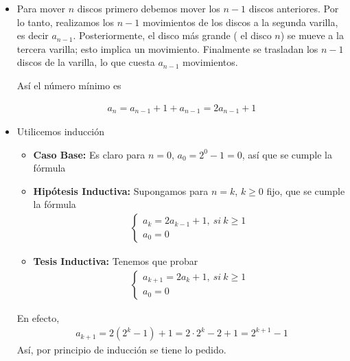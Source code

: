 \documentclass[12pt]{book}
\begin{document}
\begin{itemize}
    \item[\textbf{a)}] Para mover $n$ discos primero debemos mover los $n-1$ discos anteriores. Por lo tanto, realizamos los $n-1$ movimientos de los discos a la segunda varilla, es decir $a_{n-1}$. Posteriormente, el disco más grande ( el disco $n$) se mueve a la tercera varilla; esto implica un movimiento. Finalmente se trasladan los $n-1$ discos de la varilla, lo que cuesta $a_{n-1}$ movimientos.

Así el número mínimo es 

\begin{align*}
    a_n=a_{n-1}+1+a_{n-1}=2a_{n-1}+1
\end{align*}
\item[\textbf{b)}] Utilicemos inducción

\begin{itemize}
    \item \textbf{Caso Base:} Es claro para $n=0$, $a_0=2^0-1=0$, así que se cumple la fórmula

    \item \textbf{Hipótesis Inductiva:} Supongamos para $n=k$, $k\geq 0$ fijo, que se cumple la fórmula 
\begin{align*}
    \begin{cases}
        a_k=2a_{k-1}+1, \ si \ k\geq 1 \\
        a_0=0
    \end{cases}
\end{align*}
    \item \textbf{Tesis Inductiva:} Tenemos que probar 
\begin{align*}
     \begin{cases}
        a_{k+1}=2a_{k}+1, \ si \ k\geq 1 \\
        a_0=0
    \end{cases}
\end{align*}
\end{itemize}
En efecto,
\begin{align*}
    a_{k+1}=2(2^{k}-1)+1=2\cdot 2^k-2+1=2^{k+1}-1
\end{align*}
Así, por principio de inducción se tiene lo pedido.
\end{itemize}
\end{document}
